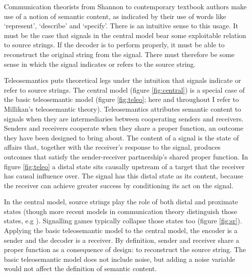 Communication theorists from Shannon to contemporary textbook authors make use of a notion of semantic content, as indicated by their use of words like `represent', `describe' and `specify'.
There is an intuitive sense to this usage.
It must be the case that signals in the central model bear some exploitable relation to source strings.
If the decoder is to perform properly, it must be able to reconstruct the original string from the signal.
There must therefore be some sense in which the signal indicates or refers to the source string.

Teleosemantics puts theoretical legs under the intuition that signals indicate or refer to source strings.
The central model (figure \ref{fig:central}) is a special case of the basic teleosemantic model (figure \ref{fig:teleo}; here and throughout I refer to Millikan's teleosemantic theory).
Teleosemantics attributes semantic content to signals when they are intermediaries between cooperating senders and receivers.
Senders and receivers cooperate when they share a proper function, an outcome they have been designed to bring about.
The content of a signal is the state of affairs that, together with the receiver's response to the signal, produces outcomes that satisfy the sender-receiver partnership's shared proper function.
In figure \ref{fig:teleo} a distal state sits causally upstream of a target that the receiver has causal influence over.
The signal has this distal state as its content, because the receiver can achieve greater success by conditioning its act on the signal.



In the central model, source strings play the role of both distal and proximate states (though more recent models in communication theory distinguish those states, e.g \citet{berger1996ceo}).
Signalling games typically collapse those states too (figure \ref{fig:sr}).
Applying the basic teleosemantic model to the central model, the encoder is a sender and the decoder is a receiver.
By definition, sender and receiver share a proper function as a consequence of design: to reconstruct the source string.
The basic teleosemantic model does not include noise, but adding a noise variable would not affect the definition of semantic content.



